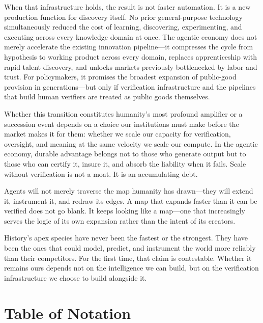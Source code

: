 \documentclass[12pt, letter]{article}
\begin{document}
When that infrastructure holds, the result is not faster automation. It is a new production function for discovery itself. No prior general-purpose technology simultaneously reduced the cost of learning, discovering, experimenting, and executing across every knowledge domain at once. The agentic economy does not merely accelerate the existing innovation pipeline---it compresses the cycle from hypothesis to working product across every domain, replaces apprenticeship with rapid talent discovery, and unlocks markets previously bottlenecked by labor and trust. For policymakers, it promises the broadest expansion of public-good provision in generations---but only if verification infrastructure and the pipelines that build human verifiers are treated as public goods themselves.

Whether this transition constitutes humanity's most profound amplifier or a succession event depends on a choice our institutions must make before the market makes it for them: whether we scale our capacity for verification, oversight, and meaning at the same velocity we scale our compute. In the agentic economy, durable advantage belongs not to those who generate output but to those who can certify it, insure it, and absorb the liability when it fails. Scale without verification is not a moat. It is an accumulating debt.

Agents will not merely traverse the map humanity has drawn---they will extend it, instrument it, and redraw its edges. A map that expands faster than it can be verified does not go blank. It keeps looking like a map---one that increasingly serves the logic of its own expansion rather than the intent of its creators.

History's apex species have never been the fastest or the strongest. They have been the ones that could model, predict, and instrument the world more reliably than their competitors. For the first time, that claim is contestable. Whether it remains ours depends not on the intelligence we can build, but on the verification infrastructure we choose to build alongside it.







\clearpage
\appendix


\clearpage

\section*{Table of Notation}
\end{document}
